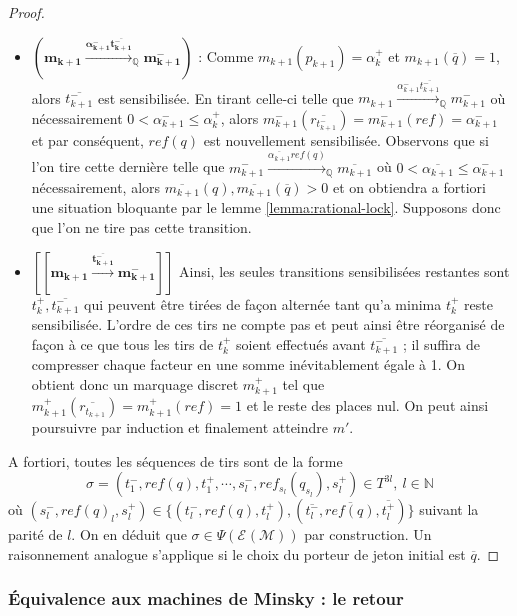 \documentclass{article}
\theoremstyle{remark}
\theoremstyle{remark}
\newcommand{\reaches}[1][]{\xrightarrow{#1}}
\newcommand{\creaches}[1][]{\reaches[#1]_{\mathbb{Q}}}
\newcommand{\runs}[2][]{\mathcal{E}^{#1}(\mathcal{#2})}
\begin{document}
\begin{proof}
\begin{itemize}
        \item $\mathbf{(m_{k+1} \creaches[\boldsymbol{\alpha}_{k+1}^- \overline{t_{k+1}^-}] m_{k+1}^-)}$ : Comme $m_{k+1}(p_{k+1}) = \alpha_k^+$ et $m_{k+1}(\overline{q}) = 1$, alors $\overline{t_{k+1}^-}$ est sensibilisée. En tirant celle-ci telle que $m_{k+1} \creaches[\alpha_{k+1}^- \overline{t_{k+1}^-}] m_{k+1}^-$ où nécessairement $0 < \alpha_{k+1}^- \leq \alpha_k^+$, alors $m_{k+1}^-(\overline{r_{t_{k+1}^-}}) = m_{k+1}^-(ref) = \alpha_{k+1}^-$ et par conséquent, $ref(q)$ est nouvellement sensibilisée. Observons que si l'on tire cette dernière telle que $m_{k+1}^- \creaches[\overline{\alpha_{k+1}} ref(q)] \overline{m_{k+1}}$ où $0 < \overline{\alpha_{k+1}} \leq \alpha_{k+1}^-$ nécessairement, alors $\overline{m_{k+1}}(q), \overline{m_{k+1}}(\overline{q}) > 0$ et on obtiendra a fortiori une situation bloquante par le lemme \ref{lemma:rational-lock}. Supposons donc que l'on ne tire pas cette transition.
        \item $\mathbf{[\![m_{k+1} \reaches[\overline{t_{k+1}^-}] m_{k+1}^-]\!]}$ Ainsi, les seules transitions sensibilisées restantes sont $t_k^+, \overline{t_{k+1}^-}$ qui peuvent être tirées de façon alternée tant qu'a minima $t_k^+$ reste sensibilisée. L'ordre de ces tirs ne compte pas et peut ainsi être réorganisé de façon à ce que tous les tirs de $t_k^+$ soient effectués avant $\overline{t_{k+1}^-}$ ; il suffira de compresser chaque facteur en une somme inévitablement égale à 1. On obtient donc un marquage discret $m_{k+1}^+$ tel que $m_{k+1}^+(\overline{r_{t_{k+1}}}) = m_{k+1}^+(ref) = 1$ et le reste des places nul. On peut ainsi poursuivre par induction et finalement atteindre $m'$.
    \end{itemize}
    A fortiori, toutes les séquences de tirs sont de la forme \[\sigma = (t_1^-, ref(q), t_1^+, \cdots, s_l^-, ref_{s_l}(q_{s_l}), s_l^+) \in T^{3l},\ l \in \mathbb{N}\] où $(s_l^-, ref(q)_l, s_l^+) \in \{(t_l^-, ref(q), t_l^+), (\overline{t_l^-}, \overline{ref(q)}, \overline{t_l^+})\}$ suivant la parité de $l$. On en déduit que $\sigma \in \Psi(\runs{M})$ par construction. Un raisonnement analogue s'applique si le choix du porteur de jeton initial est $\overline{q}$. 
\end{proof}

\subsubsection{Équivalence aux machines de Minsky : le retour}
\end{document}
